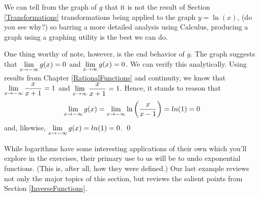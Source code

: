 \documentclass{ximera}
\begin{document}
\begin{example}
\begin{enumerate}
\begin{center}
\begin{multicols}{2}
\end{multicols}

\end{center}

  We can tell from the graph of $g$ that it is not the result of Section \ref{Transformations} transformations being applied to the graph $y = \ln(x)$, (do you see why?)  so barring a more detailed analysis using Calculus, producing a graph using a graphing utility is the best we can do.  
  
  \smallskip

One thing worthy of note, however, is the end behavior of $g$.  The graph suggests that $\ds{\lim_{x \rightarrow -\infty} g(x) = 0}$ and  $\ds{\lim_{x \rightarrow \infty} g(x) = 0}$.  We can verify this analytically.  Using results  from Chapter \ref{RationalFunctions} and continuity, we know that $\ds{\lim_{x \rightarrow -\infty} \frac{x}{x+1} = 1}$ and  $\ds{\lim_{x \rightarrow \infty} \frac{x}{x+1} = 1}$.  Hence, it stands to reason that \[\ds{\lim_{x \rightarrow -\infty} g(x) = \lim_{x \rightarrow -\infty}  \ln \left(\frac{x}{x-1}\right) = ln(1) = 0}\] and, likewise,  $\ds{\lim_{x \rightarrow -\infty} g(x) = ln(1) = 0}$.  \qed

\end{enumerate}

\end{example}

While logarithms have some interesting applications of their own which you'll explore in the exercises, their primary use to us will be to undo exponential functions. (This is, after all, how they were defined.)  Our last example  reviews not only the major topics of this section, but reviews the salient points from Section \ref{InverseFunctions}.

\newpage
\end{document}
